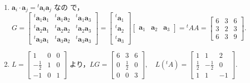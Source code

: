 \documentclass[11pt, uplatex, dvipdfmx]{jsarticle}
\begin{document}
\begin{enumerate}
\begin{enumerate}[(1)]
  \item $\bm{a}_i \cdot \bm{a}_j = {}^{t}\bm{a}_i \bm{a}_j$ なの
    で，$G= \left[
      \begin{array}{ccc}
        {}^{t}\bm{a}_1 \bm{a}_1 & {}^{t} \bm{a}_1 \bm{a}_2 & {}^{t}\bm{a}_1 \bm{a}_3\\
        {}^{t}\bm{a}_2 \bm{a}_1 & {}^{t}\bm{a}_2 \bm{a}_2 & {}^{t}\bm{a}_2 \bm{a}_3\\
        {}^{t}\bm{a}_3\bm{a}_1 & {}^{t}\bm{a}_3\bm{a}_2 & {}^{t}\bm{a}_3 \bm{a}_3
      \end{array}
    \right]=\left[
      \begin{array}{c}
        {}^{t}\bm{a}_1\\
        {}^{t}\bm{a}_2\\
        {}^{t}\bm{a}_3
      \end{array}
    \right] \left[
      \begin{array}{ccc}
        \bm{a}_1 & \bm{a}_2 & \bm{a}_3
      \end{array}
    \right]= {}^{t}AA = \left[
      \begin{array}{ccc}
        6 & 3 & 6\\
        3 & 2 & 3\\
        6 & 3 & 9
      \end{array}
    \right]$.

  \item $L=\left[
      \begin{array}{rrr}
        1 & 0 & 0\\
        -\frac{1}{2} & 1 & 0\\
        -1 & 0 & 1
      \end{array}
    \right]$ より，$LG=\left[
      \begin{array}{rrr}
        6 & 3 & 6\\
        0 & \frac{1}{2} & 0\\
        0 & 0 & 3
      \end{array}
    \right], \quad L({}^{t}A) = \left[
      \begin{array}{rrr}
        1 & 1 & 2\\
        \frac{1}{2} & -\frac{1}{2} & 0\\
        1 & 1 & -1
      \end{array}
    \right]$.


\end{enumerate}
\end{enumerate}
\end{document}
